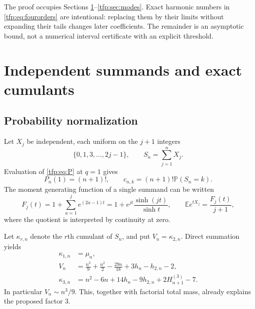 \documentclass[11pt,a4paper]{article}
\numberwithin{equation}{section}
\theoremstyle{definition}\newtheorem{definition}[theorem]{Definition}
\theoremstyle{remark}\newtheorem{remark}[theorem]{Remark}
\newcommand{\E}{\mathbb E}\newcommand{\PP}{\mathbb P}
\newcommand{\HH}[2]{H_{#1}^{(#2)}}
\begin{document}
The proof occupies Sections \ref{tfp:sec:prob}--\ref{tfp:sec:modes}. Exact harmonic
numbers in \eqref{tfp:eq:fourorders} are intentional: replacing them by their
limits without expanding their tails changes later coefficients. The
remainder is an asymptotic bound, not a numerical interval certificate
with an explicit threshold.

\section{Independent summands and exact cumulants}\label{tfp:sec:prob}
\subsection{Probability normalization}
Let $X_j$ be independent, each uniform on the $j+1$ integers
\begin{equation}
 \{0,1,3,\ldots,2j-1\},\qquad S_n=\sum_{j=1}^nX_j.
\end{equation}
Evaluation of \eqref{tfp:eq:P} at $q=1$ gives
\begin{equation}\label{tfp:eq:normalization}
 P_n(1)=(n+1)!,\qquad
 c_{n,k}=(n+1)!\PP(S_n=k).
\end{equation}
The moment generating function of a single summand can be written
\begin{equation}\label{tfp:eq:Fj}
 F_j(t)=1+\sum_{a=1}^j e^{(2a-1)t}
       =1+e^{jt}\frac{\sinh(jt)}{\sinh t},
 \qquad \E e^{tX_j}=\frac{F_j(t)}{j+1},
\end{equation}
where the quotient is interpreted by continuity at zero.

Let $\kappa_{r,n}$ denote the $r$th cumulant of $S_n$, and put
$V_n=\kappa_{2,n}$. Direct summation yields
\begin{align}
 \kappa_{1,n}&=\mu_n,\label{tfp:eq:mean}\\
 V_n&=\frac{n^3}{9}+\frac{n^2}{2}-\frac{29n}{18}
       +3h_n-h_{2,n}-2,\label{tfp:eq:variance}\\
 \kappa_{3,n}&=n^2-6n+14h_n-9h_{2,n}
          +2\HH{n+1}{3}-7.\label{tfp:eq:kappa3}
\end{align}
In particular $V_n\sim n^3/9$. This, together with factorial total mass,
already explains the proposed factor $3$.
\end{document}

